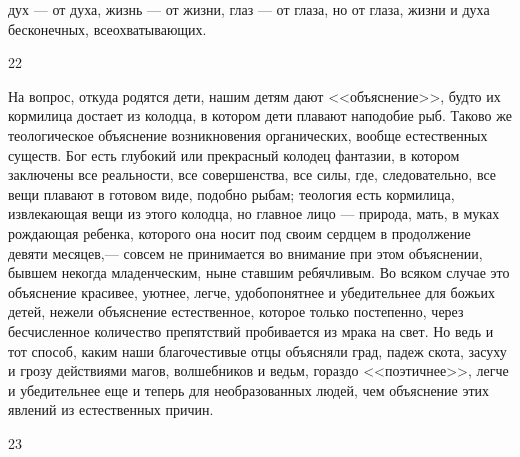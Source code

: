 \documentclass[12pt]{article}
\begin{document}
дух --- от духа, жизнь --- от жизни, глаз --- от глаза, но от глаза, жизни и духа бесконечных, всеохватывающих.



22

На вопрос, откуда родятся дети, нашим детям дают <<объяснение>>, будто их кормилица достает из колодца, в котором дети плавают наподобие рыб. Таково же теологическое объяснение возникновения органических, вообще естественных существ. Бог есть глубокий или прекрасный колодец фантазии, в котором заключены все реальности, все совершенства, все силы, где, следовательно, все вещи плавают в готовом виде, подобно рыбам; теология есть кормилица, извлекающая вещи из этого колодца, но главное лицо --- природа, мать, в муках рождающая ребенка, которого она носит под своим сердцем в продолжение девяти месяцев,--- совсем не принимается во внимание при этом объяснении, бывшем некогда младенческим, ныне ставшим ребячливым. Во всяком случае это объяснение красивее, уютнее, легче, удобопонятнее и убедительнее для божьих детей, нежели объяснение естественное, которое только постепенно, через бесчисленное количество препятствий пробивается из мрака на свет. Но ведь и тот способ, каким наши благочестивые отцы объясняли град, падеж скота, засуху и грозу действиями магов, волшебников и ведьм, гораздо <<поэтичнее>>, легче и убедительнее еще и теперь для необразованных людей, чем объяснение этих явлений из естественных причин.



23
\end{document}
